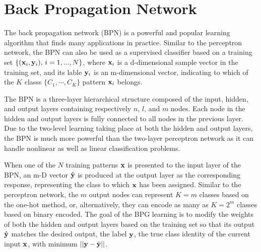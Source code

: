 \documentclass{article}
\begin{document}
\section{Back Propagation Network}

The back propagation network (BPN) is a powerful and popular 
learning algorithm that finds many applications in practice. 
Similar to the perceptron network, the BPN can also be used
as a supervised classifier based on a training set 
$\{({\bf x}_i, {\bf y}_i),\,i=1,...,N\}$, where ${\bf x}_i$ is a
d-dimensional sample vector in the training set, and its lable
${\bf y}_i$ is an m-dimensional vector, indicating to which of the 
$K$ classs $\{C_1,\cdots,C_K\}$ pattern ${\bf x}_i$ belongs. 

The BPN is a three-layer hierarchical structure composed of the 
input, hidden, and output layers containing respectively $n$, $l$, 
and $m$ nodes. Each node in the hidden and output layers is fully 
connected to all nodes in the previous layer. Due to the two-level 
learning taking place at both the hidden and output layers, the BPN 
is much more powerful than the two-layer perceptron network as it 
can handle nonlinear as well as linear classification problems.

When one of the $N$ training patterns ${\bf x}$ is presented to 
the input layer of the BPN, an m-D vector $\hat{\bf y}$ is produced
at the output layer as the corresponding response, representing the 
class to which ${\bf x}$ has been assigned. Similar to the perceptron 
network, the $m$ output nodes can represent $K=m$ classes based on 
the one-hot method, or, alternatively, they can encode as many as 
$K=2^m$ classes based on binary encoded. The goal of the BPG learning
is to modify the weights of both the hidden and output layers based on
the training set so that its output $\hat{\bf y}$ matches the desired
output, the label ${\bf y}$, the true class identity of the current 
input ${\bf x}$, with minimum $||{\bf y}-\hat{\bf y}||$.

\end{document}
